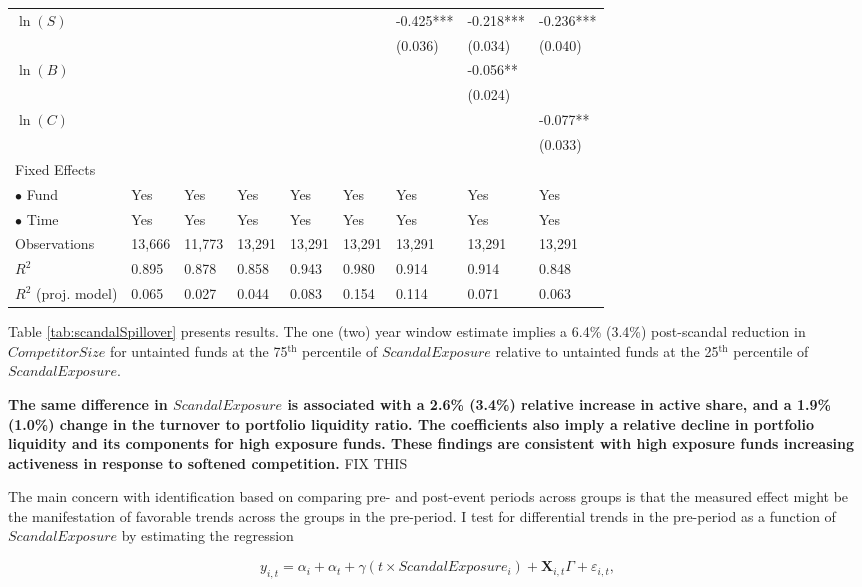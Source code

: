 \documentclass[openany]{book}
\theoremstyle{definition}
\theoremstyle{definition}
\theoremstyle{definition}
\theoremstyle{remark}
\begin{document}
\begin{table}[ht]
\begin{tabularx}{0.975\textwidth}{lYYYYYYYY}
  $\ln(S)$ &  &  &  &  &  & -0.425*** & -0.218*** & -0.236*** \\ 
   &  &  &  &  &  & (0.036) & (0.034) & (0.040) \\ 
  $\ln(B)$ &  &  &  &  &  &  & -0.056** &  \\ 
   &  &  &  &  &  &  & (0.024) &  \\ 
  $\ln(C)$ &  &  &  &  &  &  &  & -0.077** \\ 
   &  &  &  &  &  &  &  & (0.033) \\ 
  Fixed Effects &  &  &  &  &  &  &  &  \\ 
  $\bullet$ Fund & Yes & Yes & Yes & Yes & Yes & Yes & Yes & Yes \\ 
  $\bullet$ Time & Yes & Yes & Yes & Yes & Yes & Yes & Yes & Yes \\ 
  Observations & 13,666 & 11,773 & 13,291 & 13,291 & 13,291 & 13,291 & 13,291 & 13,291 \\ 
  $R^2$ & 0.895 & 0.878 & 0.858 & 0.943 & 0.980 & 0.914 & 0.914 & 0.848 \\ 
  $R^2$ (proj. model) & 0.065 & 0.027 & 0.044 & 0.083 & 0.154 & 0.114 & 0.071 & 0.063 \\ 
   \bottomrule
\end{tabularx}
\endgroup
\end{table}

Table \ref{tab:scandalSpillover} presents results. The one (two) year
window estimate implies a 6.4\% (3.4\%) post-scandal reduction in
\(CompetitorSize\) for untainted funds at the 75\(^{\text{th}}\)
percentile of \(ScandalExposure\) relative to untainted funds at the
25\(^{\text{th}}\) percentile of \(ScandalExposure\).

\textbf{The same difference in \(ScandalExposure\) is associated with a
2.6\% (3.4\%) relative increase in active share, and a 1.9\% (1.0\%)
change in the turnover to portfolio liquidity ratio. The coefficients
also imply a relative decline in portfolio liquidity and its components
for high exposure funds. These findings are consistent with high
exposure funds increasing activeness in response to softened
competition.} FIX THIS

The main concern with identification based on comparing pre- and
post-event periods across groups is that the measured effect might be
the manifestation of favorable trends across the groups in the
pre-period. I test for differential trends in the pre-period as a
function of \(ScandalExposure\) by estimating the regression

\begin{equation}
y_{i,t} = \alpha_i + \alpha_t + \gamma \left(t \times ScandalExposure_i\right) + \mathbf{X}_{i,t}\Gamma + \varepsilon_{i,t},
\end{equation}
\end{document}
